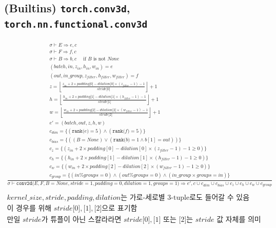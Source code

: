 \documentclass{article}
\newcommand{\x}{\times}
\newcommand{\rem}{\mtt{\%}}
\newcommand{\Rar}{\Rightarrow}
\newcommand{\ttt}[1]{\texttt{#1}}
\newcommand{\mtt}[1]{\mathtt{#1}}
\newcommand{\bigspace}{\,\,\,\,\,\,\,\,}
\newcommand{\op}[2]{\mtt{#1(}#2\mtt{)}}
\newcommand{\ind}[1]{\mtt{[}#1\mtt{]}}
\begin{document}
\subsection*{(Builtins) \ttt{torch.conv3d}, \ttt{torch.nn.functional.conv3d}}
\begin{align*}
  \frac
  {
    \begin{array}{l}
      \sigma \vdash E \Rar e, c \\
      \sigma \vdash F \Rar f, c \\
      \sigma \vdash B \Rar b, c \bigspace \text{if $B$ is not $None$} \\
      (batch, in, z_{in}, h_{in}, w_{in}) = e \\
      (out, in\_group, z_{filter}, h_{filter}, w_{filter}) = f \\
      z = \left\lfloor \frac{z_{in} + 2 \x padding \ind{0} - dilation \ind{0}
        \x (z_{filter} - 1) - 1}{stride \ind{0}} \right\rfloor + 1 \\
      h = \left\lfloor \frac{h_{in} + 2 \x padding \ind{1} - dilation \ind{1}
        \x (h_{filter} - 1) - 1}{stride \ind{1}} \right\rfloor + 1 \\
      w = \left\lfloor \frac{w_{in} + 2 \x padding \ind{2} - dilation \ind{2}
        \x (w_{filter} - 1) - 1}{stride \ind{2}} \right\rfloor + 1 \\
      e' = (batch, out, z, h, w) \\
      c_{dim} = \{ (\op{rank}{e} = 5) \land (\op{rank}{f} = 5) \} \\
      c_{bias} = \{ ((B = None) \lor (\op{rank}{b} = 1 \land b[1] = out)) \} \\
      c_z = \{ (z_{in} + 2 \x padding[0] - dilation[0] \x (z_{filter} - 1) - 1
        \geq 0) \}\\
      c_h = \{ (h_{in} + 2 \x padding[1] - dilation[1] \x (h_{filter} - 1) - 1
        \geq 0) \}\\
      c_w = \{ (w_{in} + 2 \x padding[2] - dilation[2] \x (w_{filter} - 1) - 1
        \geq 0) \}\\
      c_{group} = \{ (in \rem groups = 0) \land (out \rem groups = 0)
        \land (in\_group \x groups = in)\}
    \end{array}
  }
  {
    \sigma \vdash \op{conv2d}{E, F, B=None, stride=1, padding=0,
      dilation=1, groups=1} \Rar e', c \cup c_{dim} \cup c_{bias} \cup c_z 
        \cup c_h \cup c_w \cup c_{group}
  } \\
  \\
  \text{$kernel\_size, stride, padding, dilation$는 가로-세로별 3-tuple로도 들어갈
  수 있음} \\
  \text{이 경우를 위해 $stride\ind{0}, \ind{1}, \ind{2}$으로 표기함} \\
  \text{만일 $stride$가 튜플이 아닌 스칼라라면 $stride\ind{0}, \ind{1}$ 또는 
  $\ind{2}$는 $stride$ 값 자체를 의미}
\end{align*}%
\end{document}
